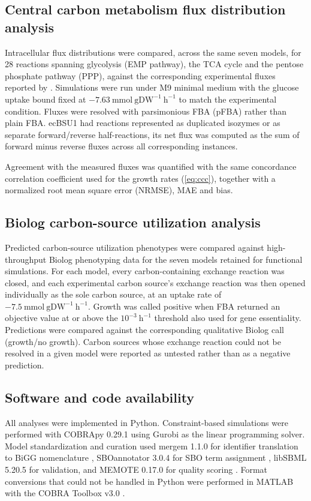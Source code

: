 \documentclass[11pt, a4paper]{article}
\begin{document}
\subsection{Central carbon metabolism flux distribution analysis}
Intracellular flux distributions were compared, across the same seven models, for 28 reactions spanning glycolysis (EMP pathway), the TCA cycle and the pentose phosphate pathway (PPP), against the corresponding experimental fluxes reported by \parencite{chubukov-2013}. Simulations were run under M9 minimal medium with the glucose uptake bound fixed at \(-7.63\ \mathrm{mmol\ gDW^{-1}\ h^{-1}}\) to match the experimental condition. Fluxes were resolved with parsimonious FBA (pFBA) rather than plain FBA. ecBSU1 had reactions represented as duplicated isozymes or as separate forward/reverse half-reactions, its net flux was computed as the sum of forward minus reverse fluxes across all corresponding instances.

Agreement with the measured fluxes was quantified with the same concordance correlation coefficient used for the growth rates (\autoref{eq:ccc}), together with a normalized root mean square error (NRMSE), MAE and bias.

\subsection{Biolog carbon-source utilization analysis}
Predicted carbon-source utilization phenotypes were compared against high-throughput Biolog phenotyping data \parencite{oh-2007} for the seven models retained for functional simulations. For each model, every carbon-containing exchange reaction was closed, and each experimental carbon source's exchange reaction was then opened individually as the sole carbon source, at an uptake rate of \(-7.5\ \mathrm{mmol\ gDW^{-1}\ h^{-1}}\). Growth was called positive when FBA returned an objective value at or above the \(10^{-3}\ \mathrm{h}^{-1}\) threshold also used for gene essentiality. Predictions were compared against the corresponding qualitative Biolog call (growth/no growth). Carbon sources whose exchange reaction could not be resolved in a given model were reported as untested rather than as a negative prediction.


\subsection{Software and code availability}

All analyses were implemented in Python. Constraint-based simulations were performed with COBRApy 0.29.1 \parencite{ebrahim-2013} using Gurobi as the linear programming solver. Model standardization and curation used mergem 1.1.0 for identifier translation to BiGG nomenclature \parencite{hari-2024}, SBOannotator 3.0.4 for SBO term assignment \parencite{leonidou-2023}, libSBML 5.20.5 for validation, and MEMOTE 0.17.0 for quality scoring \parencite{lieven-2020}. Format conversions that could not be handled in Python were performed in MATLAB with the COBRA Toolbox v3.0 \parencite{heirendt-2019}. 
\end{document}
